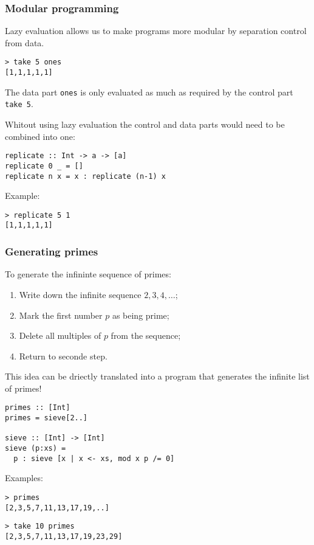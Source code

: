 \begin{multicols}{2}
\subsubsection{Modular programming}
Lazy evaluation allows us to make programs more modular by separation control from data.
\begin{lstlisting}
> take 5 ones
[1,1,1,1,1]
\end{lstlisting}
The data part \lstinline{ones} is only evaluated as much as required by the control part \lstinline{take 5}.

Whitout using lazy evaluation the control and data parts would need to be combined into one:
\begin{lstlisting}
replicate :: Int -> a -> [a]
replicate 0 _ = []
replicate n x = x : replicate (n-1) x
\end{lstlisting}

Example:\\
\begin{lstlisting}
> replicate 5 1
[1,1,1,1,1]
\end{lstlisting}

\subsubsection{Generating primes}
To generate the infininte sequence of primes:
\begin{enumerate}
  \item Write down the infinite sequence \(2,3,4,\ldots\);
  \item Mark the first number \(p\) as being prime;
  \item Delete all multiples of \(p\) from the sequence;
  \item Return to seconde step.
\end{enumerate}

This idea can be driectly translated into a program that generates the infinite list of primes!
\begin{lstlisting}
primes :: [Int]
primes = sieve[2..]

sieve :: [Int] -> [Int]
sieve (p:xs) = 
  p : sieve [x | x <- xs, mod x p /= 0]
\end{lstlisting}

Examples:
\begin{lstlisting}
> primes
[2,3,5,7,11,13,17,19,..]
\end{lstlisting}

\begin{lstlisting}
> take 10 primes
[2,3,5,7,11,13,17,19,23,29]
\end{lstlisting}


\end{multicols}
